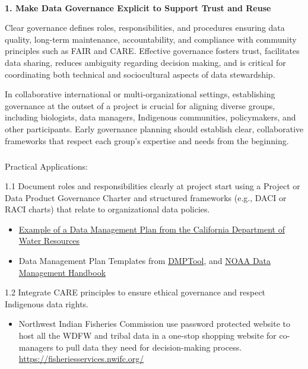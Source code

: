 \documentclass[
  letterpaper,
  DIV=11,
  numbers=noendperiod]{scrartcl}
\makeatletter
\let\oldparagraph\paragraph
\renewcommand{\paragraph}{
    \@ifstar
      \xxxParagraphStar
      \xxxParagraphNoStar
  }
\newcommand{\xxxParagraphStar}[1]{\oldparagraph*{#1}\mbox{}}
\newcommand{\xxxParagraphNoStar}[1]{\oldparagraph{#1}\mbox{}}
\let\oldsubparagraph\subparagraph
\renewcommand{\subparagraph}{
    \@ifstar
      \xxxSubParagraphStar
      \xxxSubParagraphNoStar
  }
\newcommand{\xxxSubParagraphStar}[1]{\oldsubparagraph*{#1}\mbox{}}
\newcommand{\xxxSubParagraphNoStar}[1]{\oldsubparagraph{#1}\mbox{}}
\providecommand{\tightlist}{%
  \setlength{\itemsep}{0pt}\setlength{\parskip}{0pt}}\usepackage{longtable,booktabs,array}
\makeatother
\begin{document}
\paragraph{\texorpdfstring{\textbf{1. Make Data Governance Explicit to
Support Trust and
Reuse}}{1. Make Data Governance Explicit to Support Trust and Reuse}}\label{make-data-governance-explicit-to-support-trust-and-reuse}

Clear governance defines roles, responsibilities, and procedures
ensuring data quality, long-term maintenance, accountability, and
compliance with community principles such as FAIR and CARE. Effective
governance fosters trust, facilitates data sharing, reduces ambiguity
regarding decision making, and is critical for coordinating both
technical and sociocultural aspects of data stewardship.

In collaborative international or multi-organizational settings,
establishing governance at the outset of a project is crucial for
aligning diverse groups, including biologists, data managers, Indigenous
communities, policymakers, and other participants. Early governance
planning should establish clear, collaborative frameworks that respect
each group's expertise and needs from the beginning.~

\subparagraph{Practical Applications:}\label{practical-applications}

1.1 Document roles and responsibilities clearly at project start using a
Project or Data Product Governance Charter and structured frameworks
(e.g., DACI or RACI charts) that relate to organizational data policies.

\begin{itemize}
\item
  \href{https://raw.githubusercontent.com/Br-Johnson/sdm-paper/refs/heads/main/examples/Cal_DMP.pdf}{Example
  of a Data Management Plan from the California Department of Water
  Resources}
\item
  Data Management Plan Templates from
  \href{https://dmptool.org/public_templates?page=ALL}{DMPTool}, and
  \href{https://www.noaa.gov/sites/default/files/2025-03/NAO_212-15B_-_Data_Management_Handbook.pdf}{NOAA
  Data Management Handbook}
\end{itemize}

1.2 Integrate CARE principles to ensure ethical governance and respect
Indigenous data rights.

\begin{itemize}
\tightlist
\item
  Northwest Indian Fisheries Commission use password protected website
  to host all the WDFW and tribal data in a one-stop shopping website
  for co-managers to pull data they need for decision-making process.
  \url{https://fisheriesservices.nwifc.org/}
\end{itemize}
\end{document}
